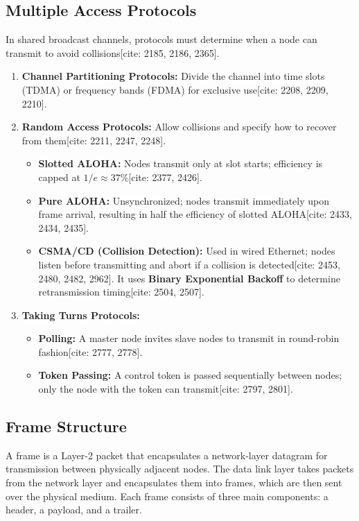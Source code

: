 \documentclass[12pt,a4paper]{article}
\begin{document}
\subsection*{Multiple Access Protocols}
In shared broadcast channels, protocols must determine when a node can transmit to avoid collisions[cite: 2185, 2186, 2365].
\begin{enumerate}
    \item \textbf{Channel Partitioning Protocols:} Divide the channel into time slots (TDMA) or frequency bands (FDMA) for exclusive use[cite: 2208, 2209, 2210].
    \item \textbf{Random Access Protocols:} Allow collisions and specify how to recover from them[cite: 2211, 2247, 2248].
    \begin{itemize}
        \item \textbf{Slotted ALOHA:} Nodes transmit only at slot starts; efficiency is capped at $1/e \approx 37\%$[cite: 2377, 2426].
        \item \textbf{Pure ALOHA:} Unsynchronized; nodes transmit immediately upon frame arrival, resulting in half the efficiency of slotted ALOHA[cite: 2433, 2434, 2435].
        \item \textbf{CSMA/CD (Collision Detection):} Used in wired Ethernet; nodes listen before transmitting and abort if a collision is detected[cite: 2453, 2480, 2482, 2962]. It uses \textbf{Binary Exponential Backoff} to determine retransmission timing[cite: 2504, 2507].
    \end{itemize}
    \item \textbf{Taking Turns Protocols:} 
    \begin{itemize}
        \item \textbf{Polling:} A master node invites slave nodes to transmit in round-robin fashion[cite: 2777, 2778].
        \item \textbf{Token Passing:} A control token is passed sequentially between nodes; only the node with the token can transmit[cite: 2797, 2801].
    \end{itemize}
\end{enumerate}

\subsection*{Frame Structure}
A frame is a Layer-2 packet that encapsulates a network-layer datagram for transmission between physically adjacent nodes. The data link layer takes packets from the network layer and encapsulates them into frames, which are then sent over the physical medium. Each frame consists of three main components: a header, a payload, and a trailer.
\end{document}
